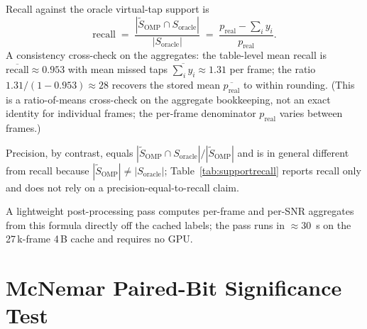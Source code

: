 Recall against the oracle virtual-tap support is
\begin{equation*}
\text{recall} \;=\; \frac{|\tilde{S}_{\text{OMP}} \cap S_{\text{oracle}}|}{|S_{\text{oracle}}|} \;=\; \frac{p_{\text{real}} - \sum_i y_i}{p_{\text{real}}}.
\end{equation*}
A consistency cross-check on the aggregates: the table-level mean recall is $\overline{\text{recall}} \approx 0.953$ with mean missed taps $\overline{\sum_i y_i} \approx 1.31$ per frame; the ratio $1.31/(1 - 0.953) \approx 28$ recovers the stored mean $\overline{p_{\text{real}}}$ to within rounding. (This is a ratio-of-means cross-check on the aggregate bookkeeping, not an exact identity for individual frames; the per-frame denominator $p_{\text{real}}$ varies between frames.)

Precision, by contrast, equals $|\tilde{S}_{\text{OMP}} \cap S_{\text{oracle}}| / |\tilde{S}_{\text{OMP}}|$ and is in general different from recall because $|\tilde{S}_{\text{OMP}}| \neq |S_{\text{oracle}}|$; Table~\ref{tab:supportrecall} reports recall only and does not rely on a precision-equal-to-recall claim.

A lightweight post-processing pass computes per-frame and per-SNR aggregates from this formula directly off the cached labels; the pass runs in $\approx 30$~s on the 27\,k-frame 4\,B cache and requires no GPU.

\section{McNemar Paired-Bit Significance Test}
\label{app:mcnemar}

